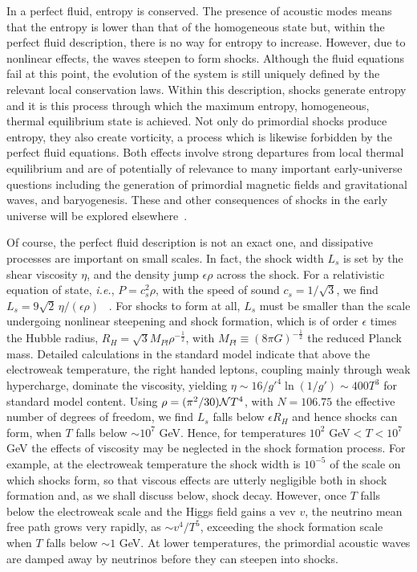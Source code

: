 \documentclass[prl,aps,10pt,twocolumn,showkeys,nofootinbib]{revtex4-1}
\def\half{\frac{1}{2}}
\begin{document}
In a perfect fluid, entropy is conserved. The presence of acoustic modes means that the entropy is lower than that of the homogeneous state but, within the perfect fluid description, there is no way for entropy to increase. However, due to nonlinear effects, the waves steepen to form shocks. Although the fluid equations fail at this point, the evolution of the system is still uniquely defined by the relevant local conservation laws. Within this description, shocks generate entropy and it is this process through which the maximum entropy, homogeneous, thermal equilibrium state is achieved. Not only do primordial shocks produce entropy, they also create vorticity, a process which is likewise forbidden by the perfect fluid equations. Both effects involve strong departures from local thermal equilibrium and are of potentially of relevance to many important early-universe questions including the generation of primordial magnetic fields and gravitational waves, and baryogenesis. These and other consequences of shocks in the early universe will be explored elsewhere~\cite{penturoklong}. 

Of course, the perfect fluid description is not an exact one, and dissipative processes are important on small scales.  In fact, the shock width $L_s$ is set by the shear viscosity $\eta$, and the density jump $\epsilon \rho$ across the shock. For a relativistic equation of state, {\it i.e.}, $P=c_s^2 \rho$, with the speed of sound $c_s=1/\sqrt{3}$, we find $L_s=9\sqrt{2}\,\eta/(\epsilon \rho)$ ~\cite{LL,penturoklong}. For shocks to form at all, $L_s$ must be smaller than the scale undergoing nonlinear steepening and shock formation, which is of order $\epsilon$ times the Hubble radius, $R_H=\sqrt{3} M_{Pl}\rho^{-\half}$, with $M_{Pl}\equiv(8 \pi G)^{-\half}$ the reduced Planck mass. Detailed calculations in the standard model \cite{moore} indicate that above the electroweak temperature, the right handed leptons, coupling mainly through weak hypercharge, dominate the viscosity, yielding $\eta\sim 16 /g'^4\ln(1/g') \sim 400 T^3$ for standard model content. Using $\rho=(\pi^2/30){\cal N} T^4$, with $N=106.75$ the effective number of degrees of freedom, we find $L_s$ falls below $\epsilon R_H$ and hence shocks can form, when $T$ falls below $\sim 10^{7}$ GeV.  Hence, for 
 temperatures $10^2$ GeV$< T <10^{7}$GeV the effects of viscosity may be neglected in the shock formation process. For example, at the electroweak temperature the shock width is $10^{-5}$ of the scale on which shocks form, so that viscous effects are utterly negligible both in shock formation and, as we shall discuss below, shock decay.  However, once $T$ falls below the electroweak scale and the Higgs field gains a vev $v$,  the neutrino mean free path grows very rapidly, as 
$\sim v^4/T^5$, exceeding the shock formation scale \cite{penturoklong} when $T$ falls below $\sim 1$ GeV. At lower temperatures, the primordial acoustic waves are damped away by neutrinos before they can steepen into shocks.
\end{document}
